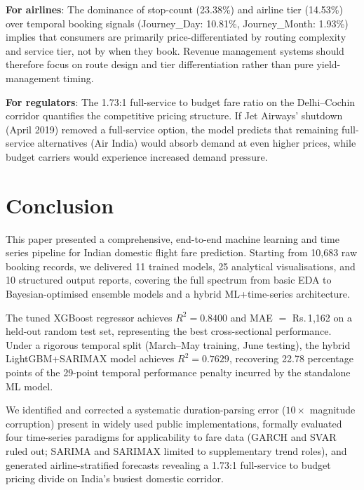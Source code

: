 \documentclass[12pt, a4paper]{article}
\begin{document}
\textbf{For airlines}: The dominance of stop-count (23.38\%) and airline tier
(14.53\%) over temporal booking signals (Journey\_Day: 10.81\%, Journey\_Month:
1.93\%) implies that consumers are primarily price-differentiated by routing
complexity and service tier, not by when they book.  Revenue management
systems should therefore focus on route design and tier differentiation rather
than pure yield-management timing.

\textbf{For regulators}: The 1.73:1 full-service to budget fare ratio on
the Delhi--Cochin corridor quantifies the competitive pricing structure.
If Jet Airways' shutdown (April 2019) removed a full-service option, the
model predicts that remaining full-service alternatives (Air India) would
absorb demand at even higher prices, while budget carriers would experience
increased demand pressure.

\section{Conclusion}
\label{sec:conclusion}

This paper presented a comprehensive, end-to-end machine learning and time
series pipeline for Indian domestic flight fare prediction.  Starting from
10{,}683 raw booking records, we delivered 11 trained models, 25 analytical
visualisations, and 10 structured output reports, covering the full spectrum
from basic EDA to Bayesian-optimised ensemble models and a hybrid
ML+time-series architecture.

The tuned XGBoost regressor achieves $R^2 = 0.8400$ and MAE $=$ Rs.\,1{,}162
on a held-out random test set, representing the best cross-sectional
performance.  Under a rigorous temporal split (March--May training, June
testing), the hybrid LightGBM+SARIMAX model achieves $R^2 = 0.7629$,
recovering 22.78 percentage points of the 29-point temporal performance penalty
incurred by the standalone ML model.

We identified and corrected a systematic duration-parsing error ($10\times$
magnitude corruption) present in widely used public implementations, formally
evaluated four time-series paradigms for applicability to fare data (GARCH and
SVAR ruled out; SARIMA and SARIMAX limited to supplementary trend roles), and
generated airline-stratified forecasts revealing a 1.73:1 full-service to
budget pricing divide on India's busiest domestic corridor.
\end{document}
